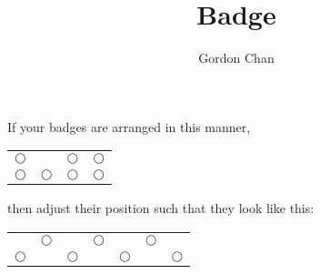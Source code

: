 \documentclass[12pt,a4paper]{article}
\title{Badge}
\author{Gordon Chan}
\begin{document}
\maketitle

If your badges are arranged in this manner,
\begin{center}
	\begin{tabular}{|cccc|}
		\hline
		$\bigcirc$& 	     &$\bigcirc$&$\bigcirc$\\
		$\bigcirc$&$\bigcirc$&$\bigcirc$&$\bigcirc$\\
		\hline
	\end{tabular}
\end{center}
then adjust their position such that they look like this:
\begin{center}
	\begin{tabular}{|ccccccc|}
		\hline
		&$\bigcirc$&&$\bigcirc$&&$\bigcirc$&\\
		$\bigcirc$&&$\bigcirc$&&$\bigcirc$&&$\bigcirc$\\
		\hline
	\end{tabular}
\end{center}
\end{document}

